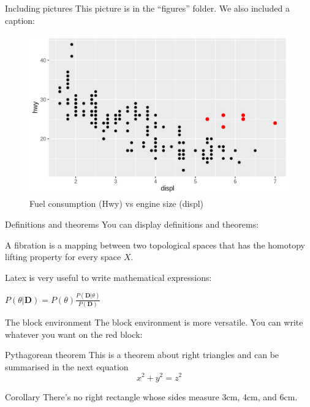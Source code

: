 \begin{frame}{Including pictures}
	This picture is in the ``figures'' folder. We also included a caption:
	\begin{figure}
	\includegraphics[scale=.5]{figures/graph.png}
	\caption{Fuel consumption (Hwy) vs engine size (displ)}
	\end{figure}
\end{frame}


\begin{frame}{Definitions and theorems}
	You can display definitions and theorems:
	\begin{definition}[Fibration]
	A fibration is a mapping between two topological spaces that has the homotopy lifting property for every space $X$.
	\end{definition}
	Latex is very useful to write mathematical expressions:
	\begin{theorem}[Bayes]
	$P(\theta|\textbf{D}) = P(\theta ) \frac{P(\textbf{D} |\theta)}{P(\textbf{D})}$
	\end{theorem}
\end{frame}

\begin{frame}{The block environment}
	The block environment is more versatile. You can write whatever you want on the red block:
	\begin{block}{Pythagorean theorem}
	This is a theorem about right triangles and can be summarised in the next 
	equation 
	\[ x^2 + y^2 = z^2 \]
	\end{block}
	\begin{block}{Corollary}
	There's no right rectangle whose sides measure 3cm, 4cm, and 6cm.
	\end{block}
\end{frame}


